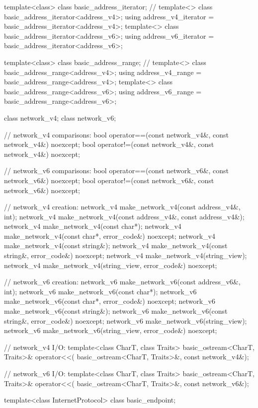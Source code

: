 \begin{codeblock}
{{{{{  template<class> class basic_address_iterator; // \notdef
  template<> class basic_address_iterator<address_v4>;
  using address_v4_iterator = basic_address_iterator<address_v4>;
  template<> class basic_address_iterator<address_v6>;
  using address_v6_iterator = basic_address_iterator<address_v6>;

  template<class> class basic_address_range; // \notdef
  template<> class basic_address_range<address_v4>;
  using address_v4_range = basic_address_range<address_v4>;
  template<> class basic_address_range<address_v6>;
  using address_v6_range = basic_address_range<address_v6>;

  class network_v4;
  class network_v6;

  // network_v4 comparisons:
  bool operator==(const network_v4&, const network_v4&) noexcept;
  bool operator!=(const network_v4&, const network_v4&) noexcept;

  // network_v6 comparisons:
  bool operator==(const network_v6&, const network_v6&) noexcept;
  bool operator!=(const network_v6&, const network_v6&) noexcept;

  // network_v4 creation:
  network_v4 make_network_v4(const address_v4&, int);
  network_v4 make_network_v4(const address_v4&, const address_v4&);
  network_v4 make_network_v4(const char*);
  network_v4 make_network_v4(const char*, error_code&) noexcept;
  network_v4 make_network_v4(const string&);
  network_v4 make_network_v4(const string&, error_code&) noexcept;
  network_v4 make_network_v4(string_view);
  network_v4 make_network_v4(string_view, error_code&) noexcept;

  // network_v6 creation:
  network_v6 make_network_v6(const address_v6&, int);
  network_v6 make_network_v6(const char*);
  network_v6 make_network_v6(const char*, error_code&) noexcept;
  network_v6 make_network_v6(const string&);
  network_v6 make_network_v6(const string&, error_code&) noexcept;
  network_v6 make_network_v6(string_view);
  network_v6 make_network_v6(string_view, error_code&) noexcept;

  // network_v4 I/O:
  template<class CharT, class Traits>
    basic_ostream<CharT, Traits>& operator<<(
      basic_ostream<CharT, Traits>&, const network_v4&);

  // network_v6 I/O:
  template<class CharT, class Traits>
    basic_ostream<CharT, Traits>& operator<<(
      basic_ostream<CharT, Traits>&, const network_v6&);

  template<class InternetProtocol>
    class basic_endpoint;

}}}}}
\end{codeblock}
